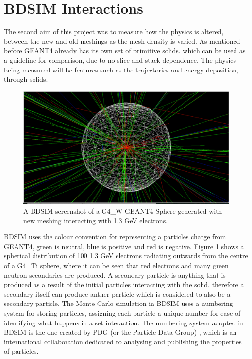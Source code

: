 \documentclass[12pt,a4paper]{article}
\begin{document}

\section{BDSIM Interactions}
\label{int}
The second aim of this project was to measure how the physics is altered, between the new and old meshings as the mesh density is varied. As mentioned before GEANT4 already has its own set of primitive solids, which can be used as a guideline for comparison, due to no slice and stack dependence. The physics being measured will be features such as the trajectories and energy deposition, through solids.

\begin{figure}[h!]
\centering
\includegraphics[scale=0.33]{Images//BDSIM//titanium.pdf}
\caption[width=\columnwidth]{A BDSIM screenshot of a G4\_W GEANT4 Sphere generated with new meshing interacting with 1.3 GeV electrons.}
\label{black}
\end{figure}

\noindent BDSIM uses the colour convention for representing a particles charge from GEANT4, green is neutral, blue is positive and red is negative. Figure \ref{black} shows a spherical distribution of 100 1.3 GeV electrons radiating outwards from the centre of a G4\_Ti sphere, where it can be seen that red electrons and many green neutron secondaries are produced. A secondary particle is anything that is produced as a result of the initial particles interacting with the solid, therefore a secondary itself can produce anther particle which is considered to also be  a secondary particle. The Monte Carlo simulation in BDSIM uses a numbering system for storing particles, assigning each particle a unique number for ease of identifying what happens in a set interaction. The numbering system adopted in BDSIM is the one created by PDG (or the Particle Data Group) \cite{pdg}, which is an international collaboration dedicated to analysing and publishing the properties of particles. 
\end{document}
